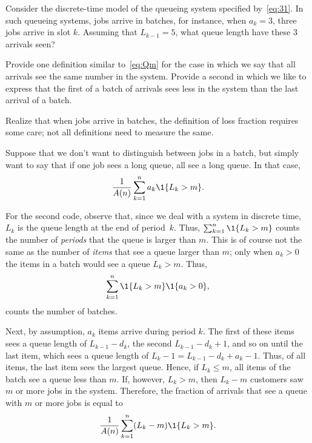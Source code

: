 \begin{exercise}
Consider the discrete-time model of the queueing system specified by~\cref{eq:31}.
In such queueing systems, jobs arrive in batches, for instance, when $a_k=3$, three jobs arrive in slot $k$.
Assuming that $L_{k-1}=5$, what queue length have these 3 arrivals seen?  

Provide one definition similar to~\cref{eq:Qm} for the case in which we say that all arrivals see the same number in the system. Provide a second in which we like to express that the first of a batch of arrivals sees less in the system than the last arrival of a batch. 
\begin{hint}
Realize that when jobs arrive in batches, the definition of loss fraction requires some care; not all definitions need to measure the same.
\end{hint}
\begin{solution} 

Suppose that we don't want to distinguish between jobs in a batch, but simply want to say that if one job sees a long queue, all see a long queue.
In that case,
\begin{equation*}
\frac 1{A(n)}\sum_{k=1}^n a_k \1{L_k > m}.
\end{equation*}


For the second code, observe that, since we deal with a system in discrete time, $L_k$ is the queue length at the end of period~$k$.
Thus, $\sum_{k=1}^n \1{L_k > m}$ counts the number of \emph{periods} that the queue is larger than $m$.
This is of course not the same as the number of \emph{items} that see a queue larger than $m$; only when $a_k>0$ the items in a batch would see a queue $L_k>m$.
Thus,
\begin{equation*}
  \sum_{k=1}^n \1{L_k > m} \1{a_k > 0},
\end{equation*}
counts the number of batches. 

Next, by assumption, $a_k$ items arrive during period $k$.
The first of these items sees a queue length of $L_{k-1} - d_k$, the second $L_{k-1}-d_k + 1$, and so on until the last item, which sees a queue length of $L_k-1 = L_{k-1} - d_k + a_k -1$.
Thus, of all items, the last item sees the largest queue.
Hence, if $L_k \leq m$, all items of the batch see a queue less than $m$.
If, however, $L_k > m$, then $L_k -m$ customers saw $m$ or more jobs in the system.
Therefore, the fraction of arrivals that see a queue with $m$ or more jobs is equal to
\begin{equation*}
 \frac 1 {A(n)} \sum_{k=1}^n (L_k - m) \1{L_k > m} .
\end{equation*}


\end{solution}
\end{exercise}
